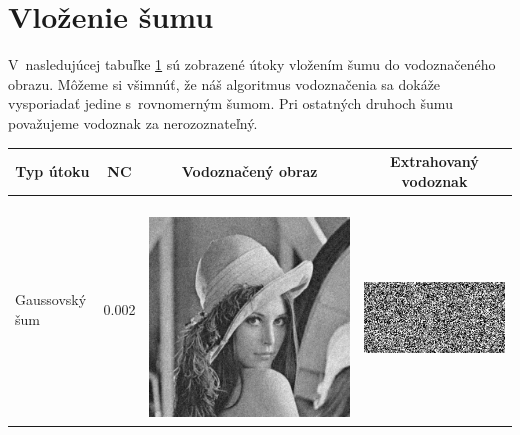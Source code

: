 \section{Vloženie šumu} \label{noise}
V~nasledujúcej tabuľke \ref{noise-table} sú zobrazené útoky vložením šumu do vodoznačeného obrazu. Môžeme si všimnúť, že náš algoritmus vodoznačenia sa dokáže vysporiadať jedine s~rovnomerným šumom. Pri ostatných druhoch šumu považujeme vodoznak za nerozoznateľný.
\begin{table}[h]
\centering
\label{noise-table}
\begin{tabular}{llcc}
\hline
\multicolumn{1}{c}{\textbf{Typ útoku}} & \multicolumn{1}{c}{\textbf{NC}} & \multicolumn{1}{c}{\textbf{Vodoznačený obraz}} & \multicolumn{1}{c}{\textbf{Extrahovaný vodoznak}} \\ \hline
Gaussovský šum                         & 0.002 & 
\begin{minipage}[c]{.1\textwidth}
\ 
  \includegraphics[scale=0.1]{obrazky/GaussianNoise}
\end{minipage} & 
\begin{minipage}[c]{.15\textwidth}
\ 
  \includegraphics[scale=0.25]{obrazky/GaussianNoise-wm}

\end{minipage}
\end{tabular}
\end{table}
